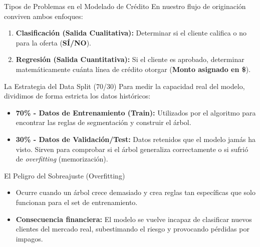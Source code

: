 \documentclass[10pt, aspectratio=169]{beamer}
\begin{document}
	\begin{frame}{Tipos de Problemas en el Modelado de Crédito}
		En nuestro flujo de originación conviven ambos enfoques:
		\vspace{0.3cm}
		\begin{enumerate}
			\item \textbf{Clasificación (Salida Cualitativa):} Determinar si el cliente califica o no para la oferta (\textbf{SÍ/NO}).
			\item \textbf{Regresión (Salida Cuantitativa):} Si el cliente es aprobado, determinar matemáticamente cuánta línea de crédito otorgar (\textbf{Monto asignado en \$}).
		\end{enumerate}
	\end{frame}
	
	\begin{frame}{La Estrategia del Data Split (70/30)}
		Para medir la capacidad real del modelo, dividimos de forma estricta los datos históricos:
		\vspace{0.4cm}
		\begin{itemize}
			\item \textbf{70\% - Datos de Entrenamiento (Train):} Utilizados por el algoritmo para encontrar las reglas de segmentación y construir el árbol.
			\item \textbf{30\% - Datos de Validación/Test:} Datos retenidos que el modelo jamás ha visto. Sirven para comprobar si el árbol generaliza correctamente o si sufrió de \textit{overfitting} (memorización).
		\end{itemize}
	\end{frame}
	
	\begin{frame}{El Peligro del Sobreajuste (Overfitting)}
		\begin{itemize}
			\item Ocurre cuando un árbol crece demasiado y crea reglas tan específicas que solo funcionan para el set de entrenamiento.
			\item \textbf{Consecuencia financiera:} El modelo se vuelve incapaz de clasificar nuevos clientes del mercado real, subestimando el riesgo y provocando pérdidas por impagos.
		\end{itemize}
	\end{frame}
	
\end{document}
